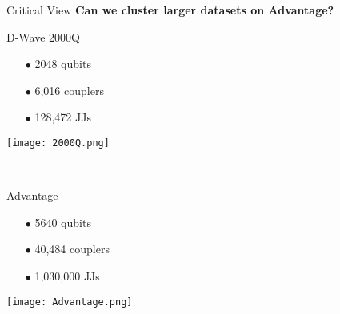 \begin{frame}[allowframebreaks]{Critical View}
		\framebreak
		\normalsize
		\textbf{Can we cluster larger datasets on Advantage?}
		\begin{center}
			\begin{minipage}{0.5\textwidth}
				D-Wave 2000Q
				\begin{itemize}
					\item[$\bullet$] 2048 qubits
					\item[$\bullet$] 6,016 couplers
					\item[$\bullet$] 128,472 JJs
				\end{itemize}
				\texttt{[image: 2000Q.png]}
			\end{minipage}~
			\begin{minipage}{0.5\textwidth}
				Advantage
				\begin{itemize}
					\item[$\bullet$] 5640 qubits
					\item[$\bullet$] 40,484 couplers
					\item[$\bullet$] 1,030,000 JJs
				\end{itemize}
				\texttt{[image: Advantage.png]}
			\end{minipage}
		\end{center}
	\end{frame}